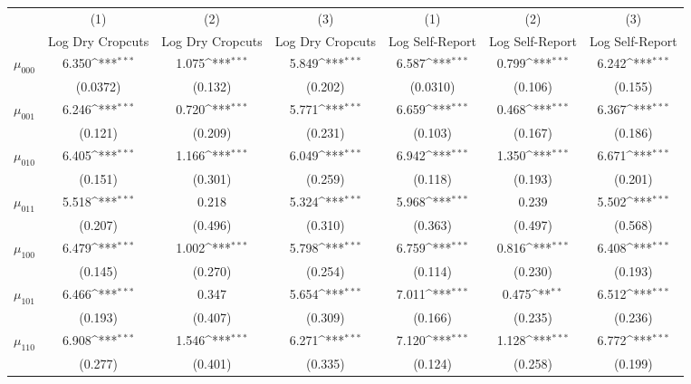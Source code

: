 {
\def\sym#1{\ifmmode^{#1}\else\(^{#1}\)\fi}
\begin{tabular}{l*{6}{c}}
\hline\hline
&\multicolumn{1}{c}{(1)}&\multicolumn{1}{c}{(2)}&\multicolumn{1}{c}{(3)} & \multicolumn{1}{c}{(1)}&\multicolumn{1}{c}{(2)}&\multicolumn{1}{c}{(3)} \\
&\multicolumn{1}{c}{Log Dry Cropcuts}&\multicolumn{1}{c}{Log Dry Cropcuts}&\multicolumn{1}{c}{Log Dry Cropcuts} & \multicolumn{1}{c}{Log Self-Report}&\multicolumn{1}{c}{Log Self-Report}&\multicolumn{1}{c}{Log Self-Report}\\

\hline
$\mu_{000}$		&    6.350\sym{***}	&    1.075\sym{***}	&    5.849\sym{***} &    6.587\sym{***} &    0.799\sym{***}	&	 6.242\sym{***}	\\ & (0.0372)	&  (0.132)	&  (0.202) 	& (0.0310)	&  (0.106)	&  (0.155)	\\
$\mu_{001}$		&    6.246\sym{***}	&    0.720\sym{***}	&    5.771\sym{***} &    6.659\sym{***} &    0.468\sym{***}	&	 6.367\sym{***}	\\ &  (0.121)	&  (0.209)	&  (0.231) 	&  (0.103)	&  (0.167)	&  (0.186)	\\
$\mu_{010}$		&    6.405\sym{***}	&    1.166\sym{***}	&    6.049\sym{***} &    6.942\sym{***} &    1.350\sym{***}	&	 6.671\sym{***}	\\ &  (0.151)	&  (0.301)	&  (0.259) 	&  (0.118)	&  (0.193)	&  (0.201)	\\
$\mu_{011}$		&    5.518\sym{***}	&    0.218         	&    5.324\sym{***} &    5.968\sym{***} &    0.239         	&	 5.502\sym{***}	\\ &  (0.207)	&  (0.496)	&  (0.310) 	&  (0.363)	&  (0.497)	&  (0.568)	\\
$\mu_{100}$		&    6.479\sym{***}	&    1.002\sym{***}	&    5.798\sym{***} &    6.759\sym{***} &    0.816\sym{***}	&	 6.408\sym{***}	\\ &  (0.145)	&  (0.270)	&  (0.254) 	&  (0.114)	&  (0.230)	&  (0.193)	\\
$\mu_{101}$		&    6.466\sym{***}	&    0.347         	&    5.654\sym{***} &    7.011\sym{***} &    0.475\sym{**} 	&	 6.512\sym{***}	\\ &  (0.193)	&  (0.407)	&  (0.309) 	&  (0.166)	&  (0.235)	&  (0.236)	\\
$\mu_{110}$		&    6.908\sym{***}	&    1.546\sym{***}	&    6.271\sym{***} &    7.120\sym{***} &    1.128\sym{***}	&	 6.772\sym{***}	\\ &  (0.277)	&  (0.401)	&  (0.335) 	&  (0.124)	&  (0.258)	&  (0.199)	\\

\end{tabular}}
